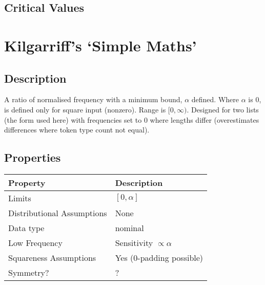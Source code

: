 \documentclass[11pt]{article}
\begin{document}
\subsection{Critical Values}












\section{Kilgarriff's `Simple Maths'}
\subsection{Description}
A ratio of normalised frequency with a minimum bound, $\alpha$ defined.  
Where $\alpha$ is 0, is defined only for square input (nonzero).  
Range is $[0, \infty)$.  
Designed for two lists (the form used here) with frequencies set to 0 where lengths differ (overestimates differences where token type count not equal).



\subsection{Properties}
\begin{tabular}{| l || l |}
    \hline
    {\bf Property} & {\bf Description} \\
    \hline
    Limits & $[0, \alpha]$ \\ \hline

    Distributional Assumptions& None \\ \hline

    Data type & nominal \\ \hline

    Low Frequency & Sensitivity $\propto \alpha$ \\ \hline

    Squareness Assumptions & Yes (0-padding possible) \\ \hline
    
    Symmetry? & ? \\ \hline

\end{tabular}
\end{document}
